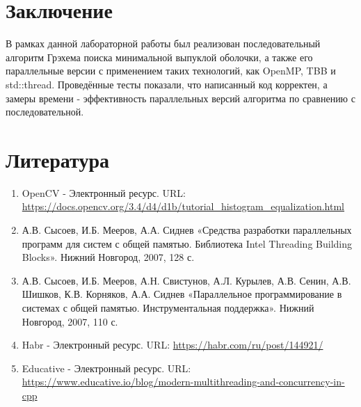 \documentclass{report}
\begin{document}
\section*{Заключение}
В рамках данной лабораторной работы был реализован последовательный алгоритм Грэхема поиска минимальной выпуклой оболочки, а также его параллельные версии с применением таких технологий, как OpenMP, TBB и std::thread. Проведённые тесты показали, что написанный код корректен, а замеры времени - эффективность параллельных версий алгоритма по сравнению с последовательной.
\newpage

\section*{Литература}
\begin{enumerate}
\item OpenCV - Электронный ресурс. URL: \newline \url{https://docs.opencv.org/3.4/d4/d1b/tutorial_histogram_equalization.html}
\item А.В. Сысоев, И.Б. Мееров, А.А. Сиднев «Средства разработки параллельных программ для систем с общей памятью. Библиотека Intel Threading Building Blocks». Нижний Новгород, 2007, 128 с.
\item А.В. Сысоев, И.Б. Мееров, А.Н. Свистунов, А.Л. Курылев, А.В. Сенин, А.В. Шишков, К.В. Корняков, А.А. Сиднев «Параллельное программирование в системах с общей
памятью. Инструментальная поддержка». Нижний Новгород, 2007, 110 с. 
\item Habr - Электронный ресурс. URL: \newline \url{https://habr.com/ru/post/144921/}
\item Educative - Электронный ресурс. URL: \newline \url{https://www.educative.io/blog/modern-multithreading-and-concurrency-in-cpp}
\end{enumerate} 
\newpage

\end{document}

